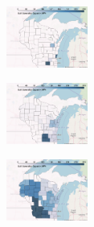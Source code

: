 \documentclass[xcolor=dvipsnames]{beamer}
\begin{document}
\begin{frame}
  \includegraphics[width=0.2\textwidth]{includes/no_carbonleak_CC_r3_built_cap.png}

  \includegraphics[width=0.2\textwidth]{includes/no_carbonleak_wind_r4_built_cap.png}

  \includegraphics[width=0.2\textwidth]{includes/no_carbonleak_wind_r5_built_cap.png}




\end{frame}
\end{document}
